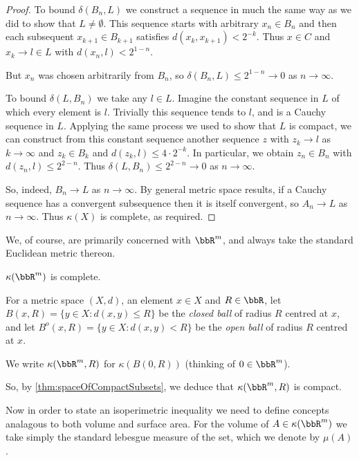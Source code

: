 \documentclass[a4paper,11pt]{article}
\begin{document}
\begin{proof}
To bound $\delta(B_n,L)$ we construct a sequence in much the same way as we did
to show that $L\not=\emptyset$.  This sequence starts with arbitrary $x_n\in
B_n$ and then each subsequent $x_{k+1}\in B_{k+1}$ satisfies
$d(x_k,x_{k+1})<2^{-k}$.  Thus $x\in C$ and $x_k\to l\in L$ with
$d(x_n,l)<2^{1-n}$.

But $x_n$ was chosen arbitrarily from $B_n$, so $\delta(B_n,L)\leq2^{1-n}\to0$
as $n\to\infty$.

To bound $\delta(L,B_n)$ we take any $l\in L$.  Imagine the constant sequence
in $L$ of which every element is $l$.  Trivially this sequence tends to $l$,
and is a Cauchy sequence in $L$.  Applying the same process we used to show
that $L$ is compact, we can construct from this constant sequence another
sequence $z$ with $z_k\to l$ as $k\to\infty$ and $z_k\in B_k$ and
$d(z_k,l)\leq4\cdot2^{-k}$.  In particular, we obtain $z_n\in B_n$ with
$d(z_n,l)\leq2^{2-n}$.  Thus $\delta(L,B_n)\leq2^{2-n}\to0$ as $n\to\infty$.

So, indeed, $B_n\to L$ as $n\to\infty$.  By general metric space results, if a
Cauchy sequence has a convergent subsequence then it is itself convergent, so
$A_n\to L$ as $n\to\infty$.  Thus $\kappa(X)$ is complete, as required.
\end{proof}

We, of course, are primarily concerned with $\bbR^m$, and always take
the standard Euclidean metric thereon.

\begin{corollary}
$\kappa(\bbR^m)$ is complete.
\end{corollary}

\begin{defn}
For a metric space $(X,d)$, an element $x\in X$ and $R\in\bbR$, let
$B(x,R)=\{y\in X:d(x,y)\leq R\}$ be the \emph{closed ball}
of radius $R$ centred at $x$, and let
$B^o(x,R)=\{y\in X:d(x,y)<R\}$ be the \emph{open ball}
of radius $R$ centred at $x$.

We write $\kappa(\bbR^m,R)$ for $\kappa(B(0,R))$ (thinking of $0\in\bbR^m$).
\end{defn}

So, by \ref{thm:spaceOfCompactSubsets}, we deduce that $\kappa(\bbR^m,R)$ is
compact.

Now in order to state an isoperimetric inequality we need to define concepts
analagous to both volume and surface area.  For the volume of
$A\in\kappa(\bbR^m)$ we take simply the standard lebesgue measure of the set,
which we denote by $\mu(A)$.
\end{document}
